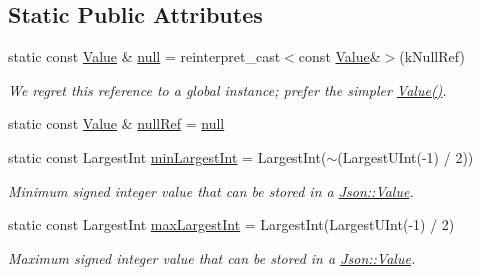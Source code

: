 \subsection*{Static Public Attributes}
\begin{DoxyCompactItemize}
\item 
\mbox{\label{class_json_1_1_value_a6d6e9ea6807e46d5b7ded66d3032f607}} 
static const \hyperlink{class_json_1_1_value}{Value} \& \hyperlink{class_json_1_1_value_a6d6e9ea6807e46d5b7ded66d3032f607}{null} = reinterpret\+\_\+cast$<$const \hyperlink{class_json_1_1_value}{Value}\&$>$(k\+Null\+Ref)
\begin{DoxyCompactList}\small\item\em We regret this reference to a global instance; prefer the simpler \hyperlink{class_json_1_1_value_ada6ba1369448fb0240bccc36efaa46f7}{Value()}. \end{DoxyCompactList}\item 
static const \hyperlink{class_json_1_1_value}{Value} \& \hyperlink{class_json_1_1_value_aaa4ffd4e53967170c3e8c9abf682b5cd}{null\+Ref} = \hyperlink{class_json_1_1_value_a6d6e9ea6807e46d5b7ded66d3032f607}{null}
\item 
\mbox{\label{class_json_1_1_value_af91df130daa50dd43d2cd89e6ee67706}} 
static const Largest\+Int \hyperlink{class_json_1_1_value_af91df130daa50dd43d2cd89e6ee67706}{min\+Largest\+Int} = Largest\+Int($\sim$(Largest\+U\+Int(-\/1) / 2))
\begin{DoxyCompactList}\small\item\em Minimum signed integer value that can be stored in a \hyperlink{class_json_1_1_value}{Json\+::\+Value}. \end{DoxyCompactList}\item 
\mbox{\label{class_json_1_1_value_a8b4977696f13296fa8755c7953fafb2f}} 
static const Largest\+Int \hyperlink{class_json_1_1_value_a8b4977696f13296fa8755c7953fafb2f}{max\+Largest\+Int} = Largest\+Int(Largest\+U\+Int(-\/1) / 2)
\begin{DoxyCompactList}\small\item\em Maximum signed integer value that can be stored in a \hyperlink{class_json_1_1_value}{Json\+::\+Value}. \end{DoxyCompactList}\item 
\mbox{\label{class_json_1_1_value_a8ddb32d9d55fa5323ae5135639dc2e31}} 

\end{DoxyCompactItemize}
